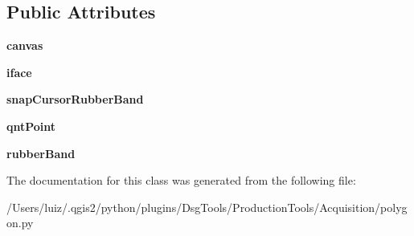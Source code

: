 \subsection*{Public Attributes}
\begin{DoxyCompactItemize}
\item 
\mbox{\label{class_dsg_tools_1_1_production_tools_1_1_acquisition_1_1polygon_1_1_polygon_ac9cd9d89f0d41a262bca634367b3bd2a}} 
{\bfseries canvas}
\item 
\mbox{\label{class_dsg_tools_1_1_production_tools_1_1_acquisition_1_1polygon_1_1_polygon_aa7fd43bcda285270cbf5a8e11a740bd3}} 
{\bfseries iface}
\item 
\mbox{\label{class_dsg_tools_1_1_production_tools_1_1_acquisition_1_1polygon_1_1_polygon_ae7451f052321dc517ebaa15e32583b90}} 
{\bfseries snap\+Cursor\+Rubber\+Band}
\item 
\mbox{\label{class_dsg_tools_1_1_production_tools_1_1_acquisition_1_1polygon_1_1_polygon_a289eeb50510343066ff715e325787228}} 
{\bfseries qnt\+Point}
\item 
\mbox{\label{class_dsg_tools_1_1_production_tools_1_1_acquisition_1_1polygon_1_1_polygon_a8a4c515c53c8f6407a487bc7f8d9c99d}} 
{\bfseries rubber\+Band}
\end{DoxyCompactItemize}


The documentation for this class was generated from the following file\+:\begin{DoxyCompactItemize}
\item 
/\+Users/luiz/.\+qgis2/python/plugins/\+Dsg\+Tools/\+Production\+Tools/\+Acquisition/polygon.\+py\end{DoxyCompactItemize}
